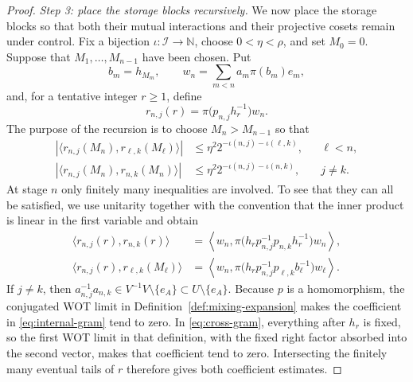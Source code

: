 \documentclass[10pt,a4paper]{amsart}
\numberwithin{equation}{section}
\newcommand{\cI}{\mathcal I}
\newcommand{\N}{\mathbb N}
\newcommand{\Step}[1]{\par\medskip\noindent\textit{#1.}\quad}
\begin{document}
\begin{proof}
\Step{Step 3: place the storage blocks recursively}
We now place the storage blocks so that both their mutual interactions and
their projective cosets remain under control.  Fix a bijection
$\iota:\cI\to\N$, choose $0<\eta<\rho$, and set $M_0=0$.
Suppose that $M_1,\ldots,M_{n-1}$ have been chosen.  Put
\begin{equation}\label{eq:past-storage-vector}
 b_m=h_{M_m},
 \qquad
 w_n=\sum_{m<n}a_m\pi(b_m)e_m,
\end{equation}
and, for a tentative integer $r\geq1$, define
\begin{equation}\label{eq:past-column-tentative}
 r_{n,j}(r)=\pi\bigl(p_{n,j}h_r^{-1}\bigr)w_n.
\end{equation}
The purpose of the recursion is to choose $M_n>M_{n-1}$ so that
\begin{align}
 |\langle r_{n,j}(M_n),r_{\ell,k}(M_\ell)\rangle|
 &\leq \eta^2 2^{-\iota(n,j)-\iota(\ell,k)},
 &&\ell<n,                                      \label{eq:cross-budget}\\
 |\langle r_{n,j}(M_n),r_{n,k}(M_n)\rangle|
 &\leq \eta^2 2^{-\iota(n,j)-\iota(n,k)},
 &&j\neq k.                                     \label{eq:internal-budget}
\end{align}
At stage $n$ only finitely many inequalities are involved.  To see that they
can all be satisfied, we use unitarity together with the convention that the
inner product is linear in the first variable and obtain
\begin{align}
 \langle r_{n,j}(r),r_{n,k}(r)\rangle
 &=\left\langle w_n,
 \pi\bigl(h_rp_{n,j}^{-1}p_{n,k}h_r^{-1}\bigr)w_n
 \right\rangle,                                  \label{eq:internal-gram}\\
 \langle r_{n,j}(r),r_{\ell,k}(M_\ell)\rangle
 &=\left\langle w_n,
 \pi\bigl(h_rp_{n,j}^{-1}p_{\ell,k}b_\ell^{-1}\bigr)w_\ell
 \right\rangle.                                  \label{eq:cross-gram}
\end{align}
If $j\neq k$, then
$a_{n,j}^{-1}a_{n,k}\in V^{-1}V\setminus\{e_A\}\subset U\setminus\{e_A\}$.
Because $p$ is a homomorphism, the conjugated WOT limit in
Definition~\ref{def:mixing-expansion} makes the coefficient in
\eqref{eq:internal-gram} tend to zero.  In \eqref{eq:cross-gram}, everything
after $h_r$ is fixed, so the first WOT limit in that definition, with the
fixed right factor absorbed into the second vector, makes that coefficient
tend to zero.  Intersecting the finitely many eventual tails of $r$ therefore
gives both coefficient estimates.


\end{proof}
\end{document}
